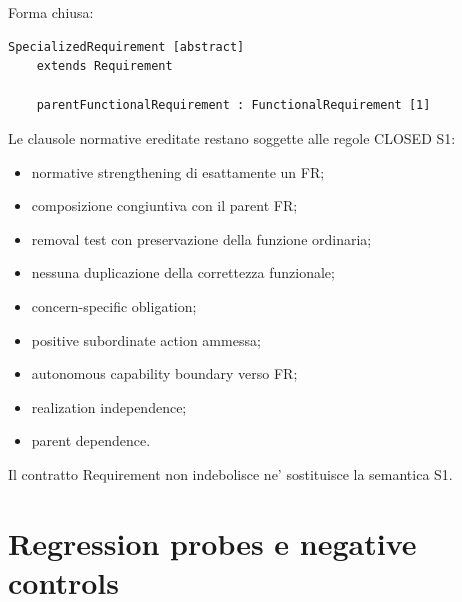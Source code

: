 \documentclass[11pt,a4paper]{article}
\begin{document}
Forma chiusa:

\begin{lstlisting}
SpecializedRequirement [abstract]
    extends Requirement

    parentFunctionalRequirement : FunctionalRequirement [1]
\end{lstlisting}

Le clausole normative ereditate restano soggette alle regole CLOSED S1:
\begin{itemize}
  \item normative strengthening di esattamente un FR;
  \item composizione congiuntiva con il parent FR;
  \item removal test con preservazione della funzione ordinaria;
  \item nessuna duplicazione della correttezza funzionale;
  \item concern-specific obligation;
  \item positive subordinate action ammessa;
  \item autonomous capability boundary verso FR;
  \item realization independence;
  \item parent dependence.
\end{itemize}

Il contratto Requirement non indebolisce ne' sostituisce la semantica S1.

\section{Regression probes e negative controls}
\end{document}
